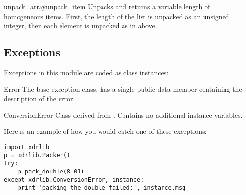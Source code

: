 \begin{funcdesc}{unpack_array}{unpack_item}
Unpacks and returns a variable length  of homogeneous items.
First, the length of the list is unpacked as an unsigned integer, then
each element is unpacked as in  above.
\end{funcdesc}

\subsection{Exceptions}

Exceptions in this module are coded as class instances:

\begin{excdesc}{Error}
The base exception class.   has a single public data
member  containing the description of the error.
\end{excdesc}

\begin{excdesc}{ConversionError}
Class derived from .  Contains no additional instance
variables.
\end{excdesc}

Here is an example of how you would catch one of these exceptions:

\begin{verbatim}
import xdrlib
p = xdrlib.Packer()
try:
    p.pack_double(8.01)
except xdrlib.ConversionError, instance:
    print 'packing the double failed:', instance.msg
\end{verbatim}
